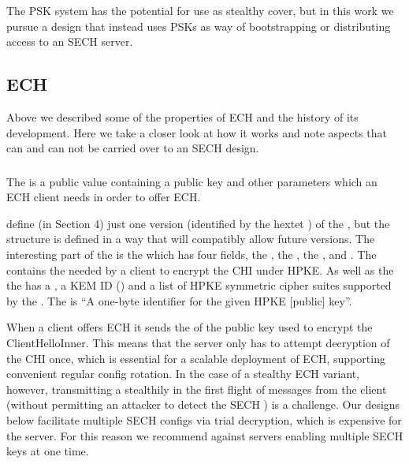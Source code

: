 The \ac{PSK} system has the potential for use as stealthy cover,
but in this work we pursue a design that instead uses \ac{PSK}s as way
of bootstrapping or distributing access to an \ac{SECH} server.




\subsection{ECH}
Above we described some
of the properties of \ac{ECH}
and the history of its development.
Here we take a closer look
at how it works and note
aspects that can and can not be carried over to an \ac{SECH} design.

\subsubsection{}
The  is a public value containing a public key and other parameters
which an \ac{ECH} client needs in order to offer \ac{ECH}.

\cite{esni} define (in Section 4) just one version (identified by the hextet ) of the , but  the structure is defined in a way that will compatibly allow future versions.
The interesting part of the  is the  which has four fields,
the , the , the , and .
The  contains the  needed by a client to encrypt the \ac{CHI} under \ac{HPKE}.
As well as the  the  has a ,
a \ac{KEM} ID () and a list of \ac{HPKE} symmetric cipher suites supported by the .
The  is ``A one-byte identifier for the given \ac{HPKE} [public] key''.

When a client offers \ac{ECH} it sends the  of the public key used to encrypt the ClientHelloInner.
This  means that the server only has to attempt decryption of the \ac{CHI} once,
which is essential for a scalable deployment of \ac{ECH},
supporting convenient regular config rotation.
In the case of a stealthy \ac{ECH} variant, however, transmitting a  stealthily in the first flight of messages from the client (without permitting an attacker to detect the \ac{SECH} ) is a challenge.
Our designs below facilitate multiple \ac{SECH} configs via trial decryption, which is expensive for the server.
For this reason we recommend against servers enabling multiple \ac{SECH} keys at one time.

